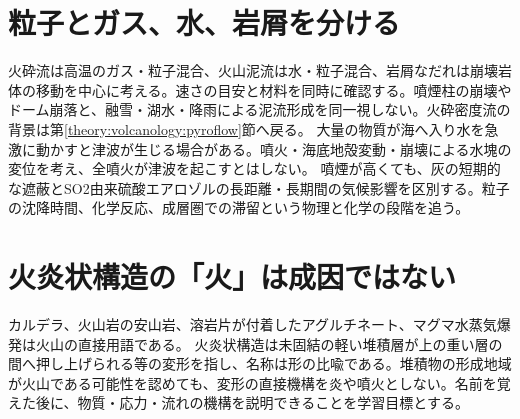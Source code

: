 \section{粒子とガス、水、岩屑を分ける}\label{theory:volcano:hazards}
火砕流は高温のガス・粒子混合、火山泥流は水・粒子混合、岩屑なだれは崩壊岩体の移動を中心に考える。速さの目安と材料を同時に確認する。噴煙柱の崩壊やドーム崩落と、融雪・湖水・降雨による泥流形成を同一視しない。火砕密度流の背景は第\ref{theory:volcanology:pyroflow}節へ戻る。
大量の物質が海へ入り水を急激に動かすと津波が生じる場合がある。噴火・海底地殻変動・崩壊による水塊の変位を考え、全噴火が津波を起こすとはしない。
噴煙が高くても、灰の短期的な遮蔽とSO2由来硫酸エアロゾルの長距離・長期間の気候影響を区別する\cite{vol50_climate_ref}。粒子の沈降時間、化学反応、成層圏での滞留という物理と化学の段階を追う。

\section{火炎状構造の「火」は成因ではない}\label{theory:volcano:terms}
カルデラ、火山岩の安山岩、溶岩片が付着したアグルチネート、マグマ水蒸気爆発は火山の直接用語である。
火炎状構造は未固結の軽い堆積層が上の重い層の間へ押し上げられる等の変形を指し、名称は形の比喩である\cite{vol50_terms_ref}。堆積物の形成地域が火山である可能性を認めても、変形の直接機構を炎や噴火としない。名前を覚えた後に、物質・応力・流れの機構を説明できることを学習目標とする。
